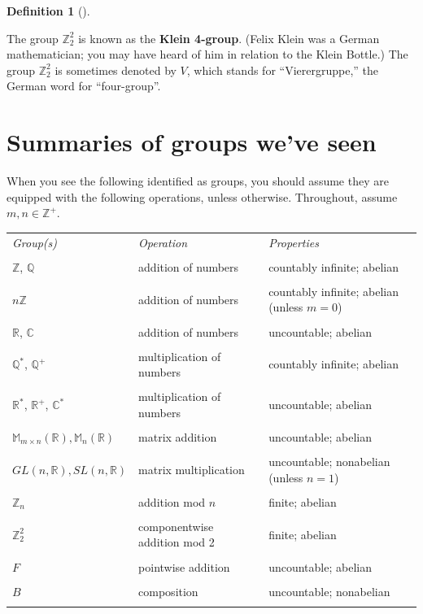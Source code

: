 \documentclass[10pt,]{book}
\newcommand{\terminology}[1]{\textbf{#1}}
\theoremstyle{plain}
\theoremstyle{definition}
\newtheorem{definition}[theorem]{Definition}
\theoremstyle{definition}
\theoremstyle{definition}
\theoremstyle{definition}
\numberwithin{equation}{section}
\newcommand{\hrulemedium}{\noalign{\hrule height 0.07em}}
\def\Z{\mathbb{Z}}
\def\R{\mathbb{R}}
\def\Q{\mathbb{Q}}
\def\C{\mathbb{C}}
\def\M{\mathbb{M}}
\begin{document}
\begin{definition}[{}]\label{definition-28}

        The group \(\Z_2^2\) is known as the \terminology{Klein 4-group}. (Felix Klein was a German mathematician; you may have heard of him in relation to the Klein Bottle.) The group \(\Z_2^2\) is sometimes denoted by \(V\), which stands for ``Vierergruppe,'' the German word for ``four-group''.%
\end{definition}
\typeout{************************************************}
\typeout{************************************************}
\section[{Summaries of groups we've seen}]{Summaries of groups we've seen}\label{section-9}

    When you see the following identified as groups, you should
    assume they are equipped with the following operations, unless
    otherwise. Throughout, assume \(m,n\in \Z^+\).
\begin{tabular}{lll}
\emph{Group(s)}&\emph{Operation}&\emph{Properties}\tabularnewline\hrulemedium
&&\tabularnewline[0pt]
\(\Z\), \(\Q\)&addition of numbers&countably
      infinite; abelian\tabularnewline[0pt]
&&\tabularnewline[0pt]
\(n\Z\)&addition of numbers&countably infinite; abelian (unless \(m=0\))\tabularnewline[0pt]
&&\tabularnewline[0pt]
\(\R\), \(\C\)&addition of numbers&uncountable; abelian\tabularnewline[0pt]
&&\tabularnewline[0pt]
\(\Q^*\), \(\Q^+\)&multiplication of  numbers&countably infinite; abelian\tabularnewline[0pt]
&&\tabularnewline[0pt]
\(\R^*\), \(\R^+\), \(\C^*\)&multiplication of  numbers&uncountable; abelian\tabularnewline[0pt]
&&\tabularnewline[0pt]
\(\M_{m\times n}(\R), \M_n(\R)\)&matrix addition&uncountable; abelian\tabularnewline[0pt]
&&\tabularnewline[0pt]
\(GL(n,\R), SL(n,\R)\)&matrix multiplication&uncountable; nonabelian (unless \(n=1\))\tabularnewline[0pt]
&&\tabularnewline[0pt]
\(\Z_n\)&addition mod \(n\)&finite; abelian\tabularnewline[0pt]
&&\tabularnewline[0pt]
\(\Z_2^2\)&componentwise addition mod 2&finite; abelian\tabularnewline[0pt]
&&\tabularnewline[0pt]
\(F\)&pointwise addition&uncountable; abelian\tabularnewline[0pt]
&&\tabularnewline[0pt]
\(B\)&composition&uncountable; nonabelian\tabularnewline[0pt]
&&
\end{tabular}
\typeout{************************************************}
\typeout{************************************************}
\end{document}
